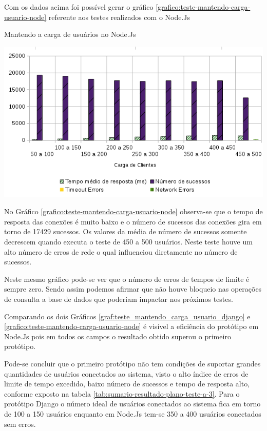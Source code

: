   Com os dados acima foi possível gerar o gráfico \ref{grafico:teste-mantendo-carga-usuario-node} referente aos testes
  realizados com o Node.Js

  \begin{grafico}[H]
    \setlength{\abovecaptionskip}{5pt}
    \setlength{\belowcaptionskip}{0pt}

    \caption[Mantendo a carga de usuários no Node.Js]
	    {Mantendo a carga de usuários no Node.Js}
    \centering
    \includegraphics[width=.80\textwidth]{imagem/graficos/grafico_node_plano_de_teste_3.png}
    \captionsetup[grafico]{justification=centering}
    \label{grafico:teste-mantendo-carga-usuario-node}
  \end{grafico}

  No Gráfico \ref{grafico:teste-mantendo-carga-usuario-node}  observa-se que o tempo de resposta das conexões
  é muito baixo e o número de sucessos das conexões gira em torno de 17429 sucessos. Os valores da média de
  número de sucessos somente decrescem quando executa o teste de 450 a 500 usuários. Neste teste houve um alto número de erros
  de rede o qual influenciou diretamente no número de sucessos.

  Neste mesmo gráfico pode-se ver que o número de erros de tempos de limite é sempre zero. Sendo assim podemos afirmar
  que não houve bloqueio nas operações de consulta a base de dados que poderiam impactar nos próximos testes.

  Comparando os dois Gráficos \ref{graf:teste_mantendo_carga_usuario_django} e \ref{grafico:teste-mantendo-carga-usuario-node} é
  visível a eficiência do protótipo em Node.Js pois em todos os campos o resultado obtido superou o primeiro protótipo.

  Pode-se concluir que o primeiro protótipo não tem condições de suportar grandes quantidades de usuários conectados ao
  sistema, visto o alto índice de erros de limite de tempo excedido, baixo número de sucessos e tempo de resposta alto,
  conforme exposto na tabela \ref{tab:sumario-resultado-plano-teste-a-3}. Para o protótipo Django o número ideal de usuários
  conectados ao sistema fica em torno de 100 a 150 usuários enquanto em Node.Js tem-se 350 a 400 usuários conectados sem
  erros.

